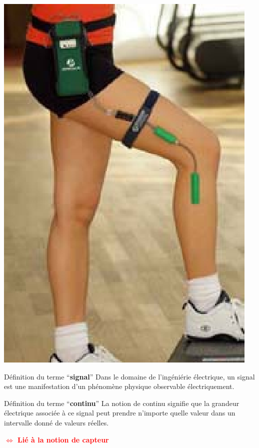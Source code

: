 \documentclass[a4paper,11pt]{beamer}
\begin{document}
\begin{frame}
\includegraphics[scale=.25]{images/Gonio.eps}
\end{frame}

\begin{frame}
\begin{block}{Définition du terme \enquote{\textbf{signal}}}
\justifying
Dans le domaine de l'ingéniérie électrique, un signal est une manifestation d'un
phénomène physique observable électriquement.
\end{block}
\pause
\begin{block}{Définition du terme \enquote{\textbf{continu}}}
\justifying
La notion de continu signifie que la grandeur électrique associée à ce signal
peut prendre n'importe quelle valeur dans un intervalle donné de valeurs réelles.
\end{block}
\vspace{1cm}
\centering
\textbf{\textcolor{red}{$\Leftrightarrow$ Lié à la notion de capteur}}
\end{frame}
\end{document}
